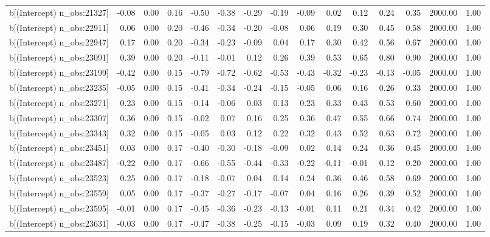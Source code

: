 \begin{table}[ht]
\begin{tabular}{rrrrrrrrrrrrrrr}
  b[(Intercept) n\_obs:21327] & -0.08 & 0.00 & 0.16 & -0.50 & -0.38 & -0.29 & -0.19 & -0.09 & 0.02 & 0.12 & 0.24 & 0.35 & 2000.00 & 1.00 \\ 
  b[(Intercept) n\_obs:22911] & 0.06 & 0.00 & 0.20 & -0.46 & -0.34 & -0.20 & -0.08 & 0.06 & 0.19 & 0.30 & 0.45 & 0.58 & 2000.00 & 1.00 \\ 
  b[(Intercept) n\_obs:22947] & 0.17 & 0.00 & 0.20 & -0.34 & -0.23 & -0.09 & 0.04 & 0.17 & 0.30 & 0.42 & 0.56 & 0.67 & 2000.00 & 1.00 \\ 
  b[(Intercept) n\_obs:23091] & 0.39 & 0.00 & 0.20 & -0.11 & -0.01 & 0.12 & 0.26 & 0.39 & 0.53 & 0.65 & 0.80 & 0.90 & 2000.00 & 1.00 \\ 
  b[(Intercept) n\_obs:23199] & -0.42 & 0.00 & 0.15 & -0.79 & -0.72 & -0.62 & -0.53 & -0.43 & -0.32 & -0.23 & -0.13 & -0.05 & 2000.00 & 1.00 \\ 
  b[(Intercept) n\_obs:23235] & -0.05 & 0.00 & 0.15 & -0.41 & -0.34 & -0.24 & -0.15 & -0.05 & 0.06 & 0.16 & 0.26 & 0.33 & 2000.00 & 1.00 \\ 
  b[(Intercept) n\_obs:23271] & 0.23 & 0.00 & 0.15 & -0.14 & -0.06 & 0.03 & 0.13 & 0.23 & 0.33 & 0.43 & 0.53 & 0.60 & 2000.00 & 1.00 \\ 
  b[(Intercept) n\_obs:23307] & 0.36 & 0.00 & 0.15 & -0.02 & 0.07 & 0.16 & 0.25 & 0.36 & 0.47 & 0.55 & 0.66 & 0.74 & 2000.00 & 1.00 \\ 
  b[(Intercept) n\_obs:23343] & 0.32 & 0.00 & 0.15 & -0.05 & 0.03 & 0.12 & 0.22 & 0.32 & 0.43 & 0.52 & 0.63 & 0.72 & 2000.00 & 1.00 \\ 
  b[(Intercept) n\_obs:23451] & 0.03 & 0.00 & 0.17 & -0.40 & -0.30 & -0.18 & -0.09 & 0.02 & 0.14 & 0.24 & 0.36 & 0.45 & 2000.00 & 1.00 \\ 
  b[(Intercept) n\_obs:23487] & -0.22 & 0.00 & 0.17 & -0.66 & -0.55 & -0.44 & -0.33 & -0.22 & -0.11 & -0.01 & 0.12 & 0.20 & 2000.00 & 1.00 \\ 
  b[(Intercept) n\_obs:23523] & 0.25 & 0.00 & 0.17 & -0.18 & -0.07 & 0.04 & 0.14 & 0.24 & 0.36 & 0.46 & 0.58 & 0.69 & 2000.00 & 1.00 \\ 
  b[(Intercept) n\_obs:23559] & 0.05 & 0.00 & 0.17 & -0.37 & -0.27 & -0.17 & -0.07 & 0.04 & 0.16 & 0.26 & 0.39 & 0.52 & 2000.00 & 1.00 \\ 
  b[(Intercept) n\_obs:23595] & -0.01 & 0.00 & 0.17 & -0.45 & -0.36 & -0.23 & -0.13 & -0.01 & 0.11 & 0.21 & 0.34 & 0.42 & 2000.00 & 1.00 \\ 
  b[(Intercept) n\_obs:23631] & -0.03 & 0.00 & 0.17 & -0.47 & -0.38 & -0.25 & -0.15 & -0.03 & 0.09 & 0.19 & 0.32 & 0.40 & 2000.00 & 1.00 \\ 

\end{tabular}
\end{table}
